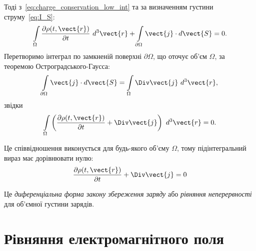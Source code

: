 Тоді з~\eqref{eq:charge_conservation_low_int}  та за визначенням густини струму~\eqref{eq:I_S}:
\begin{equation*}
	\int\limits_{\Omega} \frac{\partial\rho(t, \vect{r})}{\partial
		t} \ d^3\vect{r} + \int\limits_{\partial\Omega} \vect{j}\cdot d\vect{S} = 0.
\end{equation*}
Перетворимо інтеграл по замкненій поверхні $\partial\Omega$, що оточує об'єм $\Omega$, за теоремою
Остроградського-Гаусса:
\begin{equation*}
	\int\limits_{\partial\Omega} \vect{j}\cdot d\vect{S} = \int\limits_{\Omega}\Div\vect{j} \ d^3\vect{r},
\end{equation*}
звідки
\begin{equation*}
	\int\limits_{\Omega} \left(\frac{\partial\rho(t, \vect{r})}{\partial
		t}  +  \Div\vect{j} \right) \ d^3\vect{r} =0.
\end{equation*}

Це співвідношення виконується для будь-якого об'єму $\Omega$, тому підінтегральний вираз має дорівнювати нулю:
\begin{equation}\label{eq:charge_conservation_low_diff}
	\frac{\partial\rho(t, \vect{r})}{\partial t}  +  \Div\vect{j}  = 0
\end{equation}

Це \emph{диференціальна форма закону збереження заряду} або \emph{рівняння неперервності}
для об'ємної густини зарядів.


\section{Рівняння електромагнітного поля}


